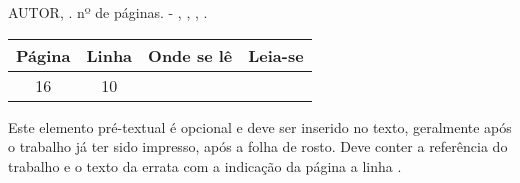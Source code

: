 \begin{errata}

\noindent AUTOR, \textbf{\imprimirtitulo} \imprimirsubtitulo. nº de páginas. \imprimirtipotrabalho - 
\imprimirdepartamento, \imprimirinstituicao, \imprimirlocal, \imprimirano.

\begin{table}[!ht]
\centering
\begin{tabular}{|c|c|c|c|} \hline
\textbf{Página} & \textbf{Linha} & \textbf{Onde se lê} & \textbf{Leia-se} \\ \hline
16 & 10 & &  \\ \hline
\end{tabular}
\end{table}


Este elemento pré-textual é opcional e deve ser inserido no texto, geralmente após o trabalho já ter sido impresso, após a folha de rosto. Deve conter a referência do trabalho e o texto da errata com a indicação da página a linha \cite{NBR14724:2011}.

\end{errata}